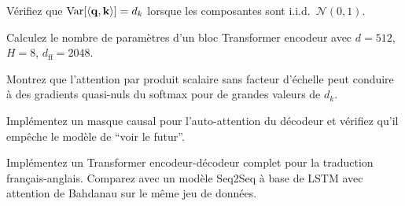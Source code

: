 \begin{exercice}[$\star$]
V\'erifiez que $\text{Var}[\langle \mathbf{q}, \mathbf{k} \rangle] = d_k$ lorsque les
composantes sont i.i.d.\ $\mathcal{N}(0, 1)$.
\end{exercice}

\begin{exercice}[$\star$]
Calculez le nombre de param\`etres d'un bloc Transformer encodeur avec
$d = 512$, $H = 8$, $d_{\text{ff}} = 2048$.
\end{exercice}

\begin{exercice}[$\star\star$]
Montrez que l'attention par produit scalaire sans facteur d'\'echelle peut
conduire \`a des gradients quasi-nuls du softmax pour de grandes valeurs de $d_k$.
\end{exercice}

\begin{exercice}[$\star\star$]
Impl\'ementez un masque causal pour l'auto-attention du d\'ecodeur et v\'erifiez
qu'il emp\^eche le mod\`ele de ``voir le futur''.
\end{exercice}

\begin{exercice}[$\star\star\star$]
Impl\'ementez un Transformer encodeur-d\'ecodeur complet pour la traduction
fran\c{c}ais-anglais. Comparez avec un mod\`ele Seq2Seq \`a base de LSTM avec
attention de Bahdanau sur le m\^eme jeu de donn\'ees.
\end{exercice}
